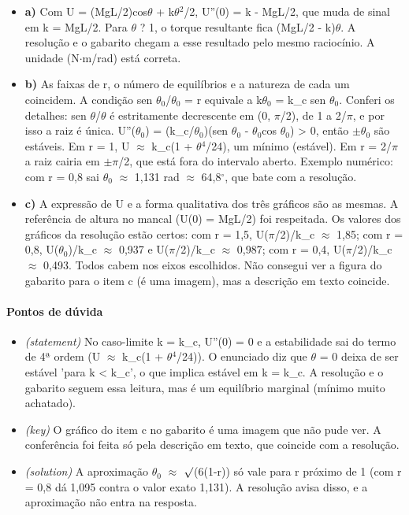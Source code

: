 \documentclass{article}%
\begin{document}
\begin{itemize}%
\item%
\textbf{a)} Com U = (MgL/2)cos$\theta$ + k$\theta$$^2$/2, U''(0) = k - MgL/2, que muda de sinal em k = MgL/2. Para $\theta$ ? 1, o torque resultante fica (MgL/2 - k)$\theta$. A resolução e o gabarito chegam a esse resultado pelo mesmo raciocínio. A unidade (N$\cdot$m/rad) está correta.%
\item%
\textbf{b)} As faixas de r, o número de equilíbrios e a natureza de cada um coincidem. A condição sen $\theta$$_{0}$/$\theta$$_{0}$ = r equivale a k$\theta$$_{0}$ = k\_c sen $\theta$$_{0}$. Conferi os detalhes: sen $\theta$/$\theta$ é estritamente decrescente em (0, $\pi$/2), de 1 a 2/$\pi$, e por isso a raiz é única. U''($\theta$$_{0}$) = (k\_c/$\theta$$_{0}$)(sen $\theta$$_{0}$ - $\theta$$_{0}$cos $\theta$$_{0}$) > 0, então $\pm$$\theta$$_{0}$ são estáveis. Em r = 1, U $\approx$ k\_c(1 + $\theta$$^{4}$/24), um mínimo (estável). Em r = 2/$\pi$ a raiz cairia em $\pm$$\pi$/2, que está fora do intervalo aberto. Exemplo numérico: com r = 0,8 sai $\theta$$_{0}$ $\approx$ 1,131 rad $\approx$ 64,8$^\circ$, que bate com a resolução.%
\item%
\textbf{c)} A expressão de U e a forma qualitativa dos três gráficos são as mesmas. A referência de altura no mancal (U(0) = MgL/2) foi respeitada. Os valores dos gráficos da resolução estão certos: com r = 1,5, U($\pi$/2)/k\_c $\approx$ 1,85; com r = 0,8, U($\theta$$_{0}$)/k\_c $\approx$ 0,937 e U($\pi$/2)/k\_c $\approx$ 0,987; com r = 0,4, U($\pi$/2)/k\_c $\approx$ 0,493. Todos cabem nos eixos escolhidos. Não consegui ver a figura do gabarito para o item c (é uma imagem), mas a descrição em texto coincide.%
\end{itemize}%
\paragraph{Pontos de dúvida}%
\begin{itemize}%
\item%
\textit{(statement)} No caso{-}limite k = k\_c, U''(0) = 0 e a estabilidade sai do termo de 4ª ordem (U $\approx$ k\_c(1 + $\theta$$^{4}$/24)). O enunciado diz que $\theta$ = 0 deixa de ser estável 'para k < k\_c', o que implica estável em k = k\_c. A resolução e o gabarito seguem essa leitura, mas é um equilíbrio marginal (mínimo muito achatado).%
\item%
\textit{(key)} O gráfico do item c no gabarito é uma imagem que não pude ver. A conferência foi feita só pela descrição em texto, que coincide com a resolução.%
\item%
\textit{(solution)} A aproximação $\theta$$_{0}$ $\approx$ $\surd$(6(1-r)) só vale para r próximo de 1 (com r = 0,8 dá 1,095 contra o valor exato 1,131). A resolução avisa disso, e a aproximação não entra na resposta.%
\end{itemize}%
\end{document}
